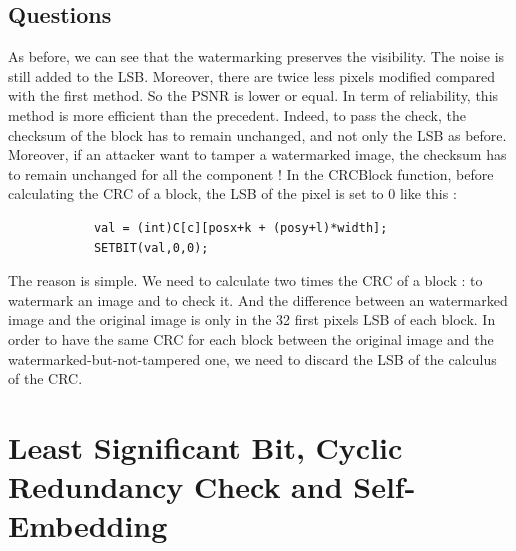 \documentclass[11pt, oneside]{article}   	%
\begin{document}
\subsection{Questions}
As before, we can see that the watermarking preserves the visibility. The noise is still added to the LSB. Moreover, there are twice less pixels modified compared with the first method. So the PSNR is lower or equal. \newline In term of reliability, this method is more efficient than the precedent. Indeed, to pass the check, the checksum of the block has to remain unchanged, and not only the LSB as before. Moreover, if an attacker want to tamper a watermarked image, the checksum has to remain unchanged for all the component ! \newline
In the CRCBlock function, before calculating the CRC of a block, the LSB of the pixel is set to 0 like this :
\begin{lstlisting}
			val = (int)C[c][posx+k + (posy+l)*width];
			SETBIT(val,0,0);
\end{lstlisting}
The reason is simple. We need to calculate two times the CRC of a block : to watermark an image and to check it. And the difference between an watermarked image and the original image is only in the 32 first pixels LSB of each block. In order to have the same CRC for each block between the original image and the watermarked-but-not-tampered one, we need to discard the LSB of the calculus of the CRC.
\section{Least Significant Bit, Cyclic Redundancy Check and Self-Embedding}
\end{document}
